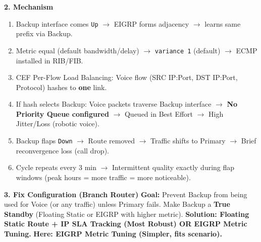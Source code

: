 \documentclass[11pt]{article}
\begin{document}
\begin{exoresolu}
\noindent\textbf{2. Mechanism}
\begin{enumerate}
    \item Backup interface comes \texttt{Up} $\rightarrow$ EIGRP forms adjacency $\rightarrow$ learns same prefix via Backup.
    \item Metric equal (default bandwidth/delay) $\rightarrow$ \texttt{variance 1} (default) $\rightarrow$ ECMP installed in RIB/FIB.
    \item CEF Per-Flow Load Balancing: Voice flow (SRC IP:Port, DST IP:Port, Protocol) hashes to \textbf{one} link.
    \item If hash selects Backup: Voice packets traverse Backup interface $\rightarrow$ \textbf{No Priority Queue configured} $\rightarrow$ Queued in Best Effort $\rightarrow$ High Jitter/Loss (robotic voice).
    \item Backup flaps \texttt{Down} $\rightarrow$ Route removed $\rightarrow$ Traffic shifts to Primary $\rightarrow$ Brief reconvergence loss (call drop).
    \item Cycle repeats every $3$ min $\rightarrow$ Intermittent quality exactly during flap windows (peak hours = more traffic = more noticeable).
\end{enumerate}

\noindent\textbf{3. Fix Configuration (Branch Router)}
\textbf{Goal:} Prevent Backup from being used for Voice (or any traffic) unless Primary fails. Make Backup a \textbf{True Standby} (Floating Static or EIGRP with higher metric).
\textbf{Solution: Floating Static Route + IP SLA Tracking (Most Robust) OR EIGRP Metric Tuning.}
\textbf{Here: EIGRP Metric Tuning (Simpler, fits scenario).}


\end{exoresolu}
\end{document}
